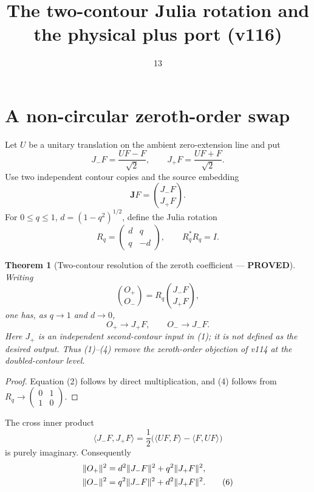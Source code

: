\documentclass[11pt]{article}
\title{The two-contour Julia rotation and the physical plus port (v116)}
\date{13}
\newcommand{\PROVED}{\textcolor{green!40!black}{\textbf{PROVED}}}
\newtheorem{theorem}{Theorem}
\begin{document}
\maketitle

\section{A non-circular zeroth-order swap}

Let $U$ be a unitary translation on the ambient zero-extension line and put
\[
 J_-F=\frac{UF-F}{\sqrt2},
 \qquad
 J_+F=\frac{UF+F}{\sqrt2}.
\]
Use two independent contour copies and the source embedding
\begin{equation}
                         \mathbf JF=\binom{J_-F}{J_+F}.         \tag{1}
\end{equation}
For $0\le q\le1$, $d=(1-q^2)^{1/2}$, define the Julia rotation
\begin{equation}
 R_q=\begin{pmatrix}d&q\\q&-d\end{pmatrix},
 \qquad R_q^*R_q=I.                                           \tag{2}
\end{equation}

\begin{theorem}[Two-contour resolution of the zeroth coefficient ---
\PROVED]
Writing
\begin{equation}
 \binom{O_+}{O_-}=R_q\binom{J_-F}{J_+F},                       \tag{3}
\end{equation}
one has, as $q\to1$ and $d\to0$,
\begin{equation}
                         O_+\longrightarrow J_+F,
 \qquad                  O_-\longrightarrow J_-F.             \tag{4}
\end{equation}
Here $J_+$ is an independent second-contour input in (1); it is not defined
as the desired output.  Thus (1)--(4) remove the zeroth-order objection of
v114 at the doubled-contour level.
\end{theorem}

\begin{proof}
Equation (2) follows by direct multiplication, and (4) follows from
$R_q\to\left(\begin{smallmatrix}0&1\\1&0\end{smallmatrix}\right)$.
\end{proof}

The cross inner product
\begin{equation}
 \langle J_-F,J_+F\rangle
 =\frac12\bigl(\langle UF,F\rangle-\langle F,UF\rangle\bigr)  \tag{5}
\end{equation}
is purely imaginary.  Consequently
\begin{align}
 \|O_+\|^2&=d^2\|J_-F\|^2+q^2\|J_+F\|^2,\notag\\
 \|O_-\|^2&=q^2\|J_-F\|^2+d^2\|J_+F\|^2.                    \tag{6}
\end{align}
\end{document}
